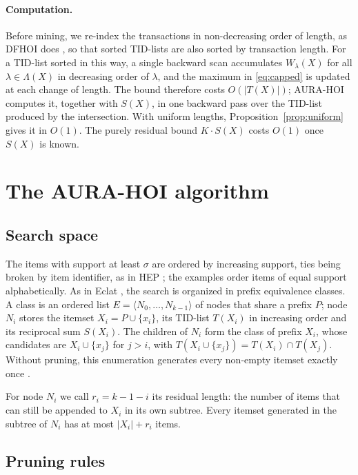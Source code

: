 \documentclass[pdflatex,sn-mathphys,Numbered]{sn-jnl}
\theoremstyle{thmstyleone}
\theoremstyle{thmstyletwo}
\theoremstyle{thmstylethree}
\newcommand{\AURA}{AURA-HOI}
\begin{document}
\paragraph{Computation.}
Before mining, we re-index the transactions in non-decreasing order of length, as DFHOI does \cite{nguyen2023dfhoi}, so that sorted TID-lists are also sorted by transaction length. For a TID-list sorted in this way, a single backward scan accumulates $W_\lambda(X)$ for all $\lambda \in \Lambda(X)$ in decreasing order of $\lambda$, and the maximum in \eqref{eq:capped} is updated at each change of length. The bound therefore costs $O(|T(X)|)$; \AURA{} computes it, together with $S(X)$, in one backward pass over the TID-list produced by the intersection. With uniform lengths, Proposition~\ref{prop:uniform} gives it in $O(1)$. The purely residual bound $K \cdot S(X)$ costs $O(1)$ once $S(X)$ is known.

\section{The \AURA{} algorithm}\label{sec:algo}

\subsection{Search space}

The items with support at least $\sigma$ are ordered by increasing support, ties being broken by item identifier, as in HEP \cite[Section~3.2.3]{deng2020hoi}; the examples order items of equal support alphabetically. As in Eclat \cite{zaki2000scalable}, the search is organized in prefix equivalence classes. A class is an ordered list $E = \langle N_0, \dots, N_{k-1} \rangle$ of nodes that share a prefix $P$; node $N_i$ stores the itemset $X_i = P \cup \{x_i\}$, its TID-list $T(X_i)$ in increasing order and its reciprocal sum $S(X_i)$. The children of $N_i$ form the class of prefix $X_i$, whose candidates are $X_i \cup \{x_j\}$ for $j > i$, with $T(X_i \cup \{x_j\}) = T(X_i) \cap T(X_j)$. Without pruning, this enumeration generates every non-empty itemset exactly once \cite{zaki2000scalable}.

For node $N_i$ we call $r_i = k - 1 - i$ its residual length: the number of items that can still be appended to $X_i$ in its own subtree. Every itemset generated in the subtree of $N_i$ has at most $|X_i| + r_i$ items.

\subsection{Pruning rules}
\end{document}
